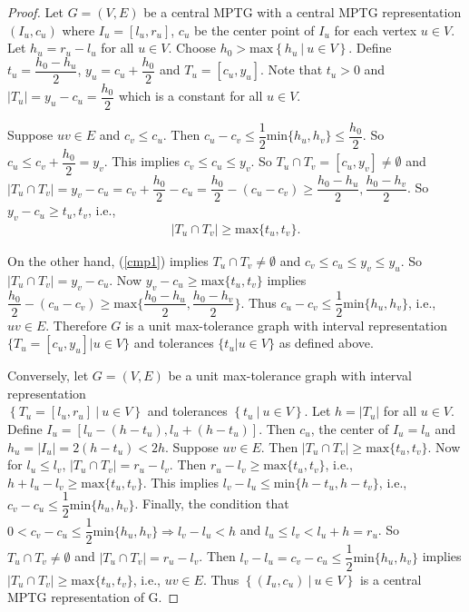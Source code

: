 \documentclass{article}
\theoremstyle{definition}
\numberwithin{equation}{section}
\newcommand{\set}[1]{\left\{#1\right\}}
\newcommand{\Set}[2]{\set{#1\ \vert\ #2}}
\begin{document}
\begin{proof}
Let $G=(V,E)$ be a central MPTG with a central MPTG representation $(I_{u},c_{u})$ where $I_{u}=[l_{u},r_{u}]$, $c_{u}$ be the center point of $I_{u}$ for each vertex $u\in V$. Let $h_{u}=r_{u}-l_{u}$ for all $u\in V$. Choose $h_{0}> \text{max} \Set{h_{u}}{u\in V}$. Define $t_{u}=\dfrac{h_{0}-h_{u}}{2}$, $y_{u}=c_{u}+\dfrac{h_{0}}{2}$ and $T_{u}=[c_{u},y_{u}]$. Note that $t_{u}>0$ and $|T_{u}|=y_{u}-c_{u}=\dfrac{h_{0}}{2}$ which is a constant for all $u\in V$.

\noindent Suppose $uv\in E$ and $c_{v}\leq c_{u}$. Then $c_{u}-c_{v}\leq \dfrac{1}{2} \text{min}\{h_{u},h_{v}\}\leq \dfrac{h_{0}}{2}$. So $c_{u}\leq c_{v}+\dfrac{h_{0}}{2}=y_{v}$. This implies $c_{v}\leq c_{u}\leq y_{v}$. So $T_{u}\cap T_{v}=[c_{u},y_{v}]\neq \emptyset$ and $|T_{u}\cap T_{v}|=y_{v}-c_{u}=c_{v}+\dfrac{h_{0}}{2}-c_{u}=\dfrac{h_{0}}{2}-(c_{u}-c_{v})\geq \dfrac{h_{0}-h_{u}}{2},\dfrac{h_{0}-h_{v}}{2}$. So $y_{v}-c_{u}\geq t_{u},t_{v}$, i.e.,
\begin{eqnarray}
\label{cmp1}
|T_{u}\cap T_{v}|\geq \text{max} \{t_{u},t_{v}\}.
\end{eqnarray}

\noindent On the other hand, (\ref{cmp1}) implies $T_{u}\cap T_{v}\neq \emptyset$ and $c_{v}\leq c_{u}\leq y_{v}\leq y_{u}$. So $|T_{u}\cap T_{v}|=y_{v}-c_{u}$. Now $y_{v}-c_{u}\geq \text{max}\{t_{u},t_{v}\}$ implies $\dfrac{h_{0}}{2} -(c_{u}-c_{v})\geq \text{max} \{\dfrac{h_{0}-h_{u}}{2},\dfrac{h_{0}-h_{v}}{2}\}$. Thus $c_{u}-c_{v}\leq \dfrac{1}{2} \text{min} \{h_{u},h_{v}\}$, i.e., $uv\in E$. Therefore $G$ is a unit max-tolerance graph with interval representation $\{T_{u}=[c_{u},y_{u}]|u\in V\}$ and tolerances $\{t_{u}|u\in V\}$ as defined above.

\vspace{0.5em}\noindent Conversely, let $G=(V,E)$ be a unit max-tolerance graph with interval representation \\
$\Set{T_{u}=[l_{u},r_{u}]}{u\in V}$ and tolerances $\Set{t_{u}}{u\in V}$. Let $h=|T_{u}|$ for all $u\in V$. Define $I_{u}=[l_{u}-(h-t_{u}),l_{u}+(h-t_{u})]$. Then $c_{u}$, the center of $I_{u}=l_{u}$ and $h_{u}=|I_{u}|=2(h-t_{u})<2h$. Suppose $uv\in E$. Then $|T_{u}\cap T_{v}|\geq \text{max} \{t_{u},t_{v}\}$. Now for $l_{u}\leq l_{v}$, $|T_{u}\cap T_{v}|=r_{u}-l_{v}$. Then $r_{u}-l_{v}\geq \text{max}\{t_{u},t_{v}\}$, i.e., $h+l_{u}-l_{v}\geq \text{max}\{t_{u},t_{v}\}$. This implies $l_{v}-l_{u}\leq \text{min}\{h-t_{u},h-t_{v}\}$, i.e., $c_{v}-c_{u}\leq \dfrac{1}{2}\text{min} \{h_{u},h_{v}\}$. Finally, the condition that $0<c_{v}-c_{u}\leq \dfrac{1}{2} \text{min} \{h_{u},h_{v}\} \Rightarrow l_{v}-l_{u}<h$ and $l_{u}\leq l_{v}<l_{u}+h=r_{u}$. So $T_{u}\cap T_{v}\neq \emptyset$ and $|T_{u}\cap T_{v}|=r_{u}-l_{v}$. Then $l_{v}-l_{u}=c_{v}-c_{u}\leq \dfrac{1}{2} \text{min}\{h_{u},h_{v}\}$ implies $|T_{u}\cap T_{v}|\geq \text{max} \{t_{u},t_{v}\}$, i.e., $uv\in E$. Thus $\Set{(I_{u},c_{u})}{u\in V}$ is a central MPTG representation of G.
\end{proof}
\end{document}
